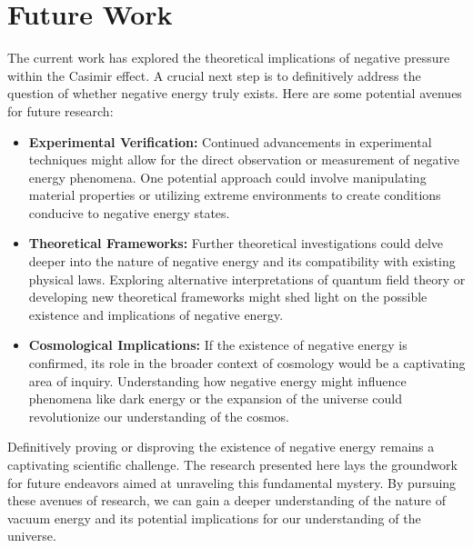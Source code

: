 \section{Future Work}

The current work has explored the theoretical implications of negative pressure within the Casimir effect. 
A crucial next step is to definitively address the question of whether negative energy truly exists. 
Here are some potential avenues for future research:
\begin{itemize}
    \item \textbf{Experimental Verification:} 
    Continued advancements in experimental techniques might allow for the direct observation 
    or measurement of negative energy phenomena. 
    One potential approach could involve manipulating material properties or utilizing extreme environments 
    to create conditions conducive to negative energy states.
    \item \textbf{Theoretical Frameworks:} 
    Further theoretical investigations could delve deeper into the nature of negative energy and 
    its compatibility with existing physical laws. 
    Exploring alternative interpretations of quantum field theory or developing new theoretical 
    frameworks might shed light on the possible existence and implications of negative energy.
    \item \textbf{Cosmological Implications:} 
    If the existence of negative energy is confirmed, 
    its role in the broader context of cosmology would be a captivating area of inquiry. 
    Understanding how negative energy might influence phenomena like dark energy or the expansion of 
    the universe could revolutionize our understanding of the cosmos.
\end{itemize}

Definitively proving or disproving the existence of negative energy remains a captivating scientific challenge. 
The research presented here lays the groundwork for future endeavors aimed at unraveling this fundamental mystery. 
By pursuing these avenues of research, we can gain a deeper understanding of the nature 
of vacuum energy and its potential implications for our understanding of the universe.
